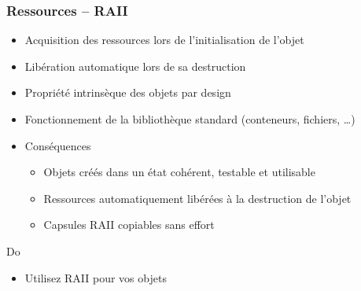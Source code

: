 \documentclass[C++.tex]{subfiles}
\begin{document}
\begin{frame}[fragile]
	\frametitle{Ressources -- RAII}


	\begin{itemize}
		\item Acquisition des ressources lors de l'initialisation de l'objet
		\item Libération automatique lors de sa destruction


		\item Propriété intrinsèque des objets par design


		\item Fonctionnement de la bibliothèque standard (conteneurs, fichiers, \ldots{})
		\item Conséquences
		\begin{itemize}
			\item Objets créés dans un état cohérent, testable et utilisable
			\item Ressources automatiquement libérées à la destruction de l'objet

			
			\item Capsules RAII copiables sans effort
		\end{itemize}
	\end{itemize}

	\begin{exampleblock}{Do}
		\begin{itemize}
			\item Utilisez RAII pour vos objets
		\end{itemize}
	\end{exampleblock}
\end{frame}
\end{document}
